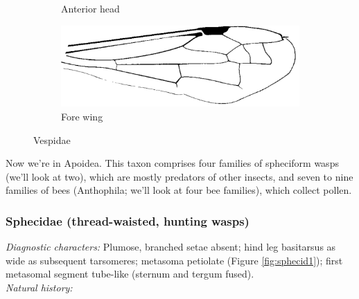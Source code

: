 \documentclass[letterpaper, 11pt]{article}
\begin{document}
\begin{figure}[ht!]
\begin{subfigure}[ht!]{0.2\textwidth}
        \caption{Anterior head \citep[][pg. 214]{goulet1993hymenoptera}}
        \label{fig:vespid2}
    \end{subfigure}
    \hfill
    \begin{subfigure}[ht!]{0.45\textwidth}
        \includegraphics[width=\textwidth]{VespidWing}
        \caption{Fore wing \citep[][pg. 214]{goulet1993hymenoptera}}
        \label{fig:vespid3}
    \end{subfigure}
    \caption{Vespidae}\label{fig:vespids}
\end{figure}
\FloatBarrier

\noindent{}Now we're in Apoidea. This taxon comprises four families of spheciform wasps (we'll look at two), which are mostly predators of other insects, and seven to nine families of bees (Anthophila; we'll look at four bee families), which collect pollen. \\

\subsubsection{Sphecidae (thread-waisted, hunting wasps)}
\noindent{}\textit{Diagnostic characters:} Plumose, branched setae absent; hind leg basitarsus as wide as subsequent tarsomeres; metasoma petiolate (Figure \ref{fig:sphecid1}); first metasomal segment tube-like (sternum and tergum fused).\\

\noindent{}\textit{Natural history:} \\
\end{document}
